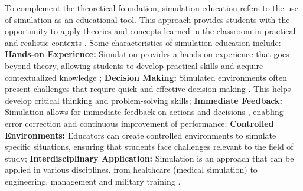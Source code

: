 To complement the theoretical foundation, simulation education refers to the use of simulation as an educational tool. This approach provides students with the opportunity to apply theories and concepts learned in the classroom in practical and realistic contexts \cite {bradley2014review}. Some characteristics of simulation education include:
\noindent \textbf{Hands-on Experience:} Simulation provides a hands-on experience that goes beyond theory, allowing students to develop practical skills and acquire contextualized knowledge \cite{weis1998computer};
\noindent \textbf{Decision Making:} Simulated environments often present challenges that require quick and effective decision-making \cite {garrett2001value}. This helps develop critical thinking and problem-solving skills; \noindent \textbf{Immediate Feedback:} Simulation allows for immediate feedback on actions and decisions \cite{tena2017training}, enabling error correction and continuous improvement of performance;
\noindent \textbf{Controlled Environments:} Educators can create controlled environments to simulate specific situations, ensuring that students face challenges relevant to the field of study;
\noindent \textbf{Interdisciplinary Application:} Simulation is an approach that can be applied in various disciplines, from healthcare (medical simulation) to engineering, management and military training \cite{harder2010use}.